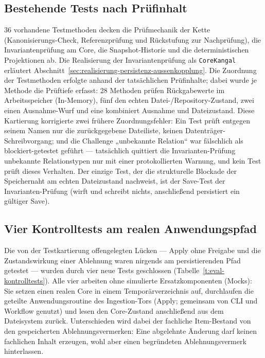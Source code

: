 \subsection{Bestehende Tests nach Prüfinhalt}
\label{sec:eval-z3}

36 vorhandene Testmethoden decken die Prüfmechanik der Kette
(Kanonisierungs-Check, Referenzprüfung und Rückstufung zur
Nachprüfung), die Invariantenprüfung am Core, die Snapshot-Historie
und die deterministischen Projektionen ab. Die Realisierung der
Invariantenprüfung als \texttt{CoreKangal} erläutert
Abschnitt~\ref{sec:realisierung-persistenz-aussenkopplung}. Die Zuordnung der Testmethoden erfolgte anhand
der tatsächlichen Prüfinhalte; dabei wurde je Methode die
Prüftiefe erfasst: 28 Methoden prüfen Rückgabewerte im Arbeitsspeicher (In-Memory), fünf
den echten Datei-/Repository-Zustand, zwei einen Ausnahme-Wurf und
eine kombiniert Ausnahme und Dateizustand. Diese Kartierung
korrigierte zwei frühere Zuordnungsfehler: Ein Test prüft entgegen
seinem Namen nur die zurückgegebene Dateiliste, keinen
Datenträger-Schreibvorgang; und die Challenge „unbekannte
Relation`` war fälschlich als blockiert-getestet geführt ---
tatsächlich quittiert die Invarianten-Prüfung unbekannte
Relationstypen nur mit einer protokollierten Warnung, und kein Test prüft
dieses Verhalten. Der einzige Test, der die strukturelle Blockade
der Speichernaht am echten Dateizustand nachweist, ist der
Save-Test der Invarianten-Prüfung (wirft und schreibt nichts,
anschließend persistiert ein gültiger Save).

\subsection{Vier Kontrolltests am realen Anwendungspfad}
\label{sec:eval-t1t4}

Die von der Testkartierung offengelegten Lücken --- Apply ohne
Freigabe und die Zustandswirkung einer Ablehnung waren nirgends am
persistierenden Pfad getestet --- wurden durch vier neue Tests
geschlossen (Tabelle~\ref{t:eval-kontrolltests}). Alle vier
arbeiten ohne simulierte Ersatzkomponenten (Mocks): Sie setzen einen realen Core in einem
Temporärverzeichnis auf, durchlaufen die geteilte
Anwendungsroutine des Ingestion-Tors
(Apply; gemeinsam von CLI und Workflow genutzt) und lesen den Core-Zustand anschließend aus
dem Dateisystem zurück. Unterschieden wird dabei der fachliche
Item-Bestand von den gespeicherten Ablehnungsvermerken: Eine abgelehnte
Änderung darf keinen fachlichen Inhalt erzeugen, wohl aber einen
begründeten Ablehnungsvermerk hinterlassen.


